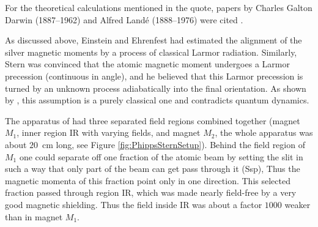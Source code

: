 \documentclass{article}
\begin{document}
For the theoretical calculations mentioned in the quote, papers by Charles Galton Darwin (1887--1962) and Alfred Land\'e (1888--1976) were cited \citep{DarwinC1928Motion,LandeA1929Polarisation}.

As discussed above, Einstein and Ehrenfest had estimated the alignment of the silver magnetic moments by a process of classical Larmor radiation.
Similarly, Stern was convinced that the atomic magnetic moment undergoes a Larmor precession (continuous in angle), and he believed that this Larmor precession is turned by an unknown process adiabatically into the final orientation.  As shown by \cite{HermansphanNEtal2000Observation}, this assumption is a purely classical one and contradicts quantum dynamics.

The apparatus of \cite{PhippsTEtal1932Einstellung} had three separated field regions combined together (magnet $M_1$, inner region IR with varying fields, and magnet $M_2$, the whole apparatus was about $20$~cm long, see Figure \ref{fig:PhippsSternSetup}). Behind the field region of $M_1$ one could separate off one fraction of the atomic beam by setting the slit in such a way that only part of the beam can get pass through it (Ssp), Thus the magnetic momenta of this fraction point only in one direction. This selected fraction passed through region IR, which was made nearly field-free by a very good magnetic shielding. Thus the field inside IR was about a factor $1000$ weaker than in magnet $M_1$. 
\end{document}

